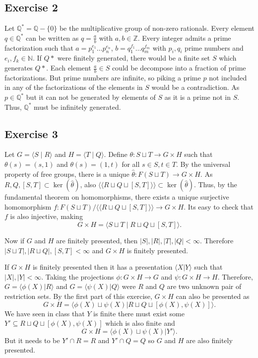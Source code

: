 \documentclass[11pt,a4paper]{article}
\newcommand{\Z}{\mathbb Z}
\newcommand{\Q}{\mathbb Q}
\newcommand{\N}{\mathbb N}
\begin{document}
\subsection*{Exercise 2}
Let $ \Q^* = \Q - \{0\} $ be the multiplicative group of non-zero rationals. Every element $ q \in \Q^* $ can be written as $ q = \frac{a}{b} $ with $ a, b \in \Z $. Every integer admits a prime factorization such that $ a = p_1^{e_1} \dots p_n^{e_n} $, $ b = q_1^{f_1} \dots q_m^{f_m} $ with $p_i, q_i $ prime numbers and $ e_i, f_k \in \N$. If $Q*$ were finitely generated, there would be a finite set $ S $ which generates $Q*$. Each element  $ \frac{a}{b} \in S $ could be decompose into a fraction of prime factorizations. But prime numbers are infinite, so piking a prime $ p $ not included in any of the factorizations of the elements in $ S $ would be a contradiction. As $ p \in \Q^*$ but it can not be generated by elements of $ S $ as it is a prime not in $ S $. Thus, $ \Q^*$ must be infinitely generated.

\subsection*{Exercise 3}
Let $ G = \langle S \mid R \rangle $ and $ H = \langle T \mid Q \rangle $. Define $ \theta: S \sqcup T \to G \times H $ such that $ \theta(s) = (s, 1) $ and $ \theta(s) = (1, t) $ for all $ s \in S, t\in T$. By the universal property of free groups, there is a unique $ \hat \theta \colon F(S \sqcup T) \to G \times H $. As $ R , Q , [S, T] \subset \ker(\hat \theta) $, also $ \langle \langle R \sqcup Q \sqcup [S, T]\rangle\rangle \subset \ker(\hat \theta) $. Thus, by the fundamental theorem on homomorphisms, there exists a unique surjective homomorphism $ f \colon F(S \sqcup T) / \langle \langle R \sqcup Q \sqcup [S, T]\rangle\rangle \to G \times H $. Its easy to check that $ f $ is also injective, making
$$
  G \times H = \langle S \sqcup T \mid R \sqcup Q \sqcup [S, T] \rangle.
$$

Now if $ G $ and $ H $ are finitely presented, then $ |S|, |R|, |T|, |Q| < \infty $. Therefore $ |S \sqcup T|, |R \sqcup Q|, [S, T] < \infty $ and $ G \times H $ is finitely presented.

If $ G \times H $ is finitely presented then it has a presentation $ \langle X | Y \rangle $ such that $|X|, |Y| < \infty $. Taking the projections $ \phi \colon G \times H \to G $ and $ \psi \colon G \times H \to H $. Therefore, $ G = \langle \phi(X) | R \rangle $ and $ G = \langle \psi(X) | Q \rangle $ were $ R $ and $ Q $ are two unknown pair of restriction sets. By the first part of this exercise, $ G \times H $ can also be presented as
$$
  G \times H = \langle \phi(X) \sqcup \psi(X) | R \sqcup Q \sqcup [\phi(X), \psi(X)] \rangle.
$$
We have seen in class that $ Y $ is finite there must exist some $Y' \subseteq R \sqcup Q \sqcup [\phi(X), \psi(X)] $ which is also finite and 
$$
  G \times H = \langle \phi(X) \sqcup \psi(X) | Y' \rangle.
$$
But it needs to be $ Y' \cap R = R $ and $ Y' \cap Q = Q $ so $ G $ and $ H $ are also finitely presented.
\end{document}
